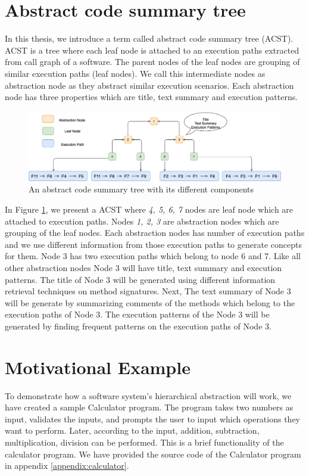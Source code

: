 \section{Abstract code summary tree}
\label{background:cct}
In this thesis, we introduce a term called abstract code summary tree (ACST). ACST is a tree where each leaf node is attached to an execution paths extracted from call graph of a software. The parent nodes of the leaf nodes are grouping of similar execution paths (leaf nodes). We call this intermediate nodes as abstraction node as they abstract similar execution scenarios. Each abstraction node has three properties which are title, text summary and execution patterns. 

\begin{figure}[h]
  \centering
  \includegraphics[width=\columnwidth]{figures/background/cct.png}
  \caption{An abstract code summary tree with its different components }
  \label{background:cct}
\end{figure}
In Figure \ref{background:cct}, we present a ACST where \emph{4, 5, 6, 7} nodes are leaf node which are attached to execution paths. Nodes \emph{1, 2, 3} are abstraction nodes which are grouping of the leaf nodes. Each abstraction nodes has number of execution paths and we use different information from those execution paths to generate concepts for them. Node 3 has two execution paths which belong to node 6 and 7. Like all other abstraction nodes Node 3 will have title, text summary and execution patterns. The title of Node 3 will be generated using different information retrieval techniques on method signatures. Next, The text summary of Node 3 will be generate by summarizing comments of the methods which belong to the execution paths of Node 3. The execution patterns of the Node 3 will be generated by finding frequent patterns on the execution paths of Node 3.

\section{Motivational Example}
\label{background:motive}
To demonstrate how a software system's hierarchical abstraction will work, we have created a sample Calculator program. The program takes two numbers as input, validates the inputs, and prompts the user to input which operations they want to perform. Later, according to the input, addition, subtraction, multiplication, division can be performed. This is a brief functionality of the calculator program. We have provided the source code of the Calculator program in appendix \ref{appendix:calculator}.

